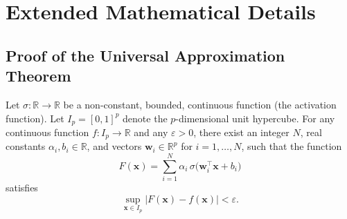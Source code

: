 \section{Extended Mathematical Details}
\label{annexure:math_details}

\subsection{Proof of the Universal Approximation Theorem}
\label{annexure:uat_proof}

\begin{theorem}
\label{thm:uat_annexure}
Let $\sigma : \mathbb{R} \to \mathbb{R}$ be a non-constant, bounded, continuous function (the activation function). Let $I_p = [0,1]^p$ denote the $p$-dimensional unit hypercube. For any continuous function $f : I_p \to \mathbb{R}$ and any $\varepsilon > 0$, there exist an integer $N$, real constants $\alpha_i, b_i \in \mathbb{R}$, and vectors $\mathbf{w}_i \in \mathbb{R}^p$ for $i = 1, \ldots, N$, such that the function
\[
  F(\mathbf{x}) = \sum_{i=1}^{N} \alpha_i \, \sigma\!\bigl(\mathbf{w}_i^\top \mathbf{x} + b_i\bigr)
\]
satisfies
\[
  \sup_{\mathbf{x} \in I_p} \bigl| F(\mathbf{x}) - f(\mathbf{x}) \bigr| < \varepsilon.
\]
\end{theorem}

